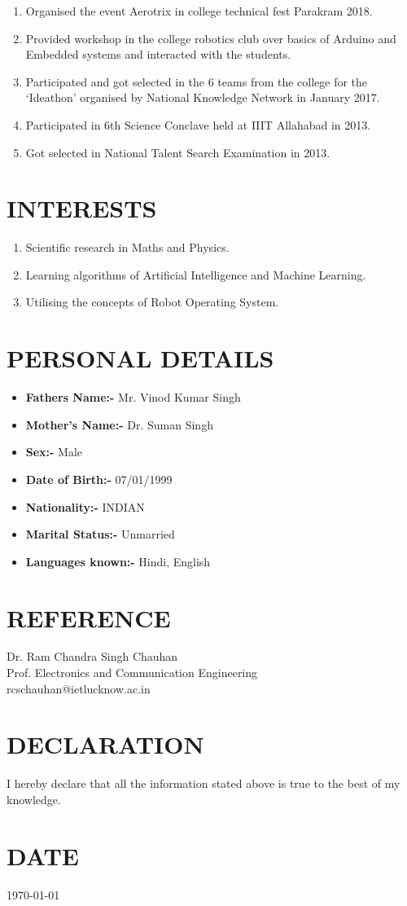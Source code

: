 \documentclass[margin,line]{res}
\begin{document}
\begin{resume}
\begin{enumerate}
\item Organised the event Aerotrix in college technical fest Parakram 2018.
\item Provided workshop in the college robotics club over basics of Arduino and Embedded systems and interacted with the students.
\item Participated and got selected in the 6 teams from the college for the ‘Ideathon’ organised by National Knowledge Network in January 2017.
\item Participated in 6th Science Conclave held at IIIT Allahabad in 2013.
\item Got selected in National Talent Search Examination in 2013.
\end{enumerate}\hfill
\section{\sc INTERESTS}
\begin{enumerate}
\item Scientific research in Maths and Physics.
\item Learning algorithms of Artificial Intelligence and Machine Learning.
\item Utilising the concepts of Robot Operating System.
\end{enumerate}
\section{\sc PERSONAL DETAILS}

\begin{itemize}
\item {\bf Fathers Name:-} Mr. Vinod Kumar Singh
\item {\bf Mother’s Name:-} Dr. Suman Singh
\item {\bf Sex:-} Male
\item {\bf Date of Birth:-} 07/01/1999
\item {\bf Nationality:-} INDIAN
\item {\bf Marital Status:-} Unmarried
\item {\bf Languages known:-} Hindi, English
\end{itemize}

\section{\sc REFERENCE} Dr. Ram Chandra Singh Chauhan\\
Prof. Electronics and Communication Engineering\\ rcschauhan@ietlucknow.ac.in

\section{\sc DECLARATION} I hereby declare that all the information stated above is true to the best of my knowledge.

\section{\sc DATE} \today
\end{resume}
\end{document}
